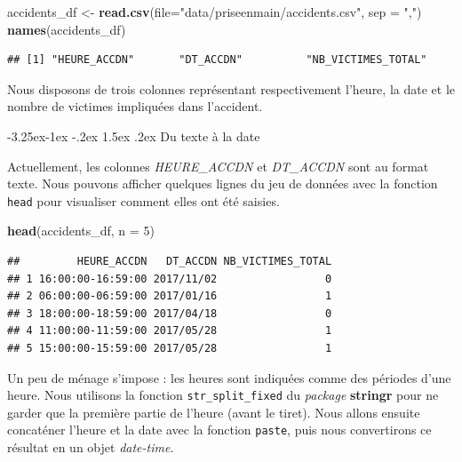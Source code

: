 \documentclass[
  11pt,
  french,
]{book}
\makeatletter
\newenvironment{Shaded}{\begin{snugshade}}{\end{snugshade}}
\newcommand{\DataTypeTok}[1]{\textcolor[rgb]{0.13,0.29,0.53}{#1}}
\newcommand{\DecValTok}[1]{\textcolor[rgb]{0.00,0.00,0.81}{#1}}
\newcommand{\KeywordTok}[1]{\textcolor[rgb]{0.13,0.29,0.53}{\textbf{#1}}}
\newcommand{\NormalTok}[1]{#1}
\newcommand{\StringTok}[1]{\textcolor[rgb]{0.31,0.60,0.02}{#1}}
\newenvironment{kframe}{%
\medskip{}
\setlength{\fboxsep}{.8em}
 \def\at@end@of@kframe{}%
 \ifinner\ifhmode%
  \def\at@end@of@kframe{\end{minipage}}%
  \begin{minipage}{\columnwidth}%
 \fi\fi%
 \def\FrameCommand##1{\hskip\@totalleftmargin \hskip-\fboxsep
 \colorbox{shadecolor}{##1}\hskip-\fboxsep
     \hskip-\linewidth \hskip-\@totalleftmargin \hskip\columnwidth}%
 \MakeFramed {\advance\hsize-\width
   \@totalleftmargin\z@ \linewidth\hsize
   \@setminipage}}%
 {\par\unskip\endMakeFramed%
 \at@end@of@kframe}
\renewenvironment{Shaded}{\begin{kframe}}{\end{kframe}}
\renewcommand\paragraph{\@startsection{paragraph}{4}{\z@}%
   {-3.25ex\@plus -1ex \@minus -.2ex}%
   {1.5ex \@plus .2ex}%
   {\normalfont\normalsize\bfseries}}
\makeatother
\begin{document}
\begin{Shaded}
\begin{Highlighting}[]
\NormalTok{accidents_df <-}\StringTok{ }\KeywordTok{read.csv}\NormalTok{(}\DataTypeTok{file=}\StringTok{"data/priseenmain/accidents.csv"}\NormalTok{, }\DataTypeTok{sep =} \StringTok{","}\NormalTok{)}
\KeywordTok{names}\NormalTok{(accidents_df)}
\end{Highlighting}
\end{Shaded}

\begin{verbatim}
## [1] "HEURE_ACCDN"       "DT_ACCDN"          "NB_VICTIMES_TOTAL"
\end{verbatim}

Nous disposons de trois colonnes représentant respectivement l'heure, la date et le nombre de victimes impliquées dans l'accident.

\hypertarget{sect014261}{%
\paragraph{Du texte à la date}\label{sect014261}}

Actuellement, les colonnes \emph{HEURE\_ACCDN} et \emph{DT\_ACCDN} sont au format texte. Nous pouvons afficher quelques lignes du jeu de données avec la fonction \texttt{head} pour visualiser comment elles ont été saisies.

\begin{Shaded}
\begin{Highlighting}[]
\KeywordTok{head}\NormalTok{(accidents_df, }\DataTypeTok{n =} \DecValTok{5}\NormalTok{)}
\end{Highlighting}
\end{Shaded}

\begin{verbatim}
##         HEURE_ACCDN   DT_ACCDN NB_VICTIMES_TOTAL
## 1 16:00:00-16:59:00 2017/11/02                 0
## 2 06:00:00-06:59:00 2017/01/16                 1
## 3 18:00:00-18:59:00 2017/04/18                 0
## 4 11:00:00-11:59:00 2017/05/28                 1
## 5 15:00:00-15:59:00 2017/05/28                 1
\end{verbatim}

Un peu de ménage s'impose : les heures sont indiquées comme des périodes d'une heure. Nous utilisons la fonction \texttt{str\_split\_fixed} du \emph{package} \textbf{stringr} pour ne garder que la première partie de l'heure (avant le tiret). Nous allons ensuite concaténer l'heure et la date avec la fonction \texttt{paste}, puis nous convertirons ce résultat en un objet \emph{date-time}.
\end{document}

